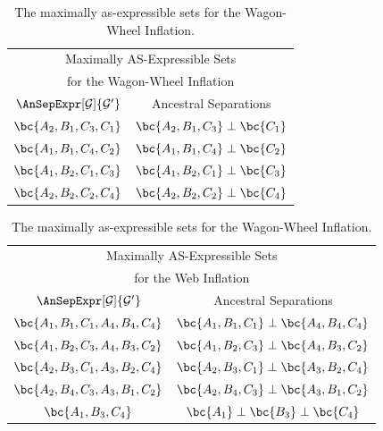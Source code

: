\documentclass[aps, 10pt, english, twoside, pra, nofootinbib, tightenlines, longbibliography, superscriptaddress]{revtex4-1}
\begin{document}
    \begin{nscenter}
        \begin{table}
        \parbox{.45\linewidth}{
            \centering
            \begin{tabular}{|c|c|}
                \hline
                \multicolumn{2}{|c|}{Maximally AS-Expressible Sets} \\
                \multicolumn{2}{|c|}{for the Wagon-Wheel Inflation} \\
                \hline
                $\AnSepExpr[\graph]{\graph'}$ & Ancestral Separations \\
                \hline
                $\bc{A_2, B_1, C_3, C_1}$ & $\bc{A_2, B_1, C_3} \ancestralindep \bc{C_1}$ \\
                $\bc{A_1, B_1, C_4, C_2}$ & $\bc{A_1, B_1, C_4} \ancestralindep \bc{C_2}$ \\
                $\bc{A_1, B_2, C_1, C_3}$ & $\bc{A_1, B_2, C_1} \ancestralindep \bc{C_3}$ \\
                $\bc{A_2, B_2, C_2, C_4}$ & $\bc{A_2, B_2, C_2} \ancestralindep \bc{C_4}$ \\
                \hline
            \end{tabular}
            \caption{The maximally as-expressible sets for the Wagon-Wheel Inflation.
            \label{tab:asexpr_triangle_structure_wagon_wheel}}
        }
        \hfill
        \parbox{.45\linewidth}{
            \centering
            \begin{tabular}{|c|c|}
                \hline
                \multicolumn{2}{|c|}{Maximally AS-Expressible Sets} \\
                \multicolumn{2}{|c|}{for the Web Inflation} \\
                \hline
                $\AnSepExpr[\graph]{\graph'}$ & Ancestral Separations \\
                \hline
                $\bc{A_1, B_1, C_1, A_4, B_4, C_4}$ & $\bc{A_1, B_1, C_1} \ancestralindep \bc{A_4, B_4, C_4}$ \\
                $\bc{A_1, B_2, C_3, A_4, B_3, C_2}$ & $\bc{A_1, B_2, C_3} \ancestralindep \bc{A_4, B_3, C_2}$ \\
                $\bc{A_2, B_3, C_1, A_3, B_2, C_4}$ & $\bc{A_2, B_3, C_1} \ancestralindep \bc{A_3, B_2, C_4}$ \\
                $\bc{A_2, B_4, C_3, A_3, B_1, C_2}$ & $\bc{A_2, B_4, C_3} \ancestralindep \bc{A_3, B_1, C_2}$ \\
                $\bc{A_1, B_3, C_4}$ & $\bc{A_1} \ancestralindep \bc{B_3} \ancestralindep \bc{C_4}$ \\

\end{tabular}}
\end{table}
\end{nscenter}
\end{document}
